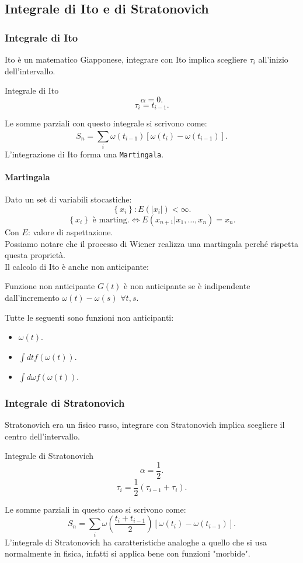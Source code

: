\subsection{Integrale di Ito e di Stratonovich}%
\label{sub:Integrale di Ito e di Stratonovich}
\subsubsection{Integrale di Ito}%
\label{subsub:Integrale di Ito}
Ito è un matematico Giapponese, integrare con Ito implica scegliere $\tau_i$ all'inizio dell'intervallo.
\begin{bluebox}{Integrale di Ito}
    \[
        \alpha  = 0
    .\] 
    \[
	\tau_i = t_{i-1}
    .\] 
\end{bluebox}
\noindent
Le somme parziali con questo integrale si scrivono come:
\[
    S_n = \sum_{i}^{} \omega (t_{i-1}) \left[\omega (t_i) -\omega (t_{i-1}) \right]
.\]
L'integrazione di Ito forma una \texttt{Martingala}.
\paragraph{Martingala}%
\label{par:Martingala}
Dato un set di variabili stocastiche:
\[
    \left\{x_i\right\}: E(\left|x_i\right|) < \infty
.\] 
\[
    \left\{x_i\right\} \text{ è marting.} \iff
    E(x_{n+1}|x_1,\ldots,x_n) = x_n
.\] 
Con $E$: valore di aspettazione.\\
Possiamo notare che il processo di Wiener realizza una martingala perché rispetta questa proprietà.\\
Il calcolo di Ito è anche non anticipante:
\begin{redbox}{Funzione non anticipante}
    $G(t)$ è non anticipante se è indipendente dall'incremento $\omega (t) - \omega (s) $ $\forall t, s$.
\end{redbox}
\noindent
\begin{exmp}
    Tutte le seguenti sono funzioni non anticipanti:
    \begin{itemize}
	\item $\omega (t) $.
	\item $\int dt f(\omega (t) ) $.
	\item $\int d\omega f(\omega (t) ) $.
    \end{itemize}
\end{exmp}
\noindent
\subsubsection{Integrale di Stratonovich}%
\label{subsub:Integrale di Stratonovich}
Stratonovich era un fisico russo, integrare con Stratonovich implica scegliere il centro dell'intervallo.
\begin{bluebox}{Integrale di Stratonovich}
    \[
        \alpha = \frac{1}{2}
    .\] 
    \[
        \tau_i = \frac{1}{2}\left(\tau_{i-1}+ \tau_i\right)
    .\] 
\end{bluebox}
\noindent
Le somme parziali in questo caso si scrivono come:
\[
    S_n = \sum_{i}^{} \omega\left(\frac{t_i + t_{i-1}}{2}\right)\left[\omega (t_i) -\omega (t_{i-1}) \right]
.\] 
L'integrale di Stratonovich ha caratteristiche analoghe a quello che si usa normalmente in fisica, infatti si applica bene con funzioni "morbide".
